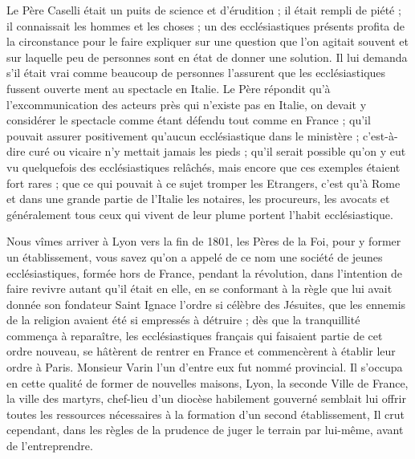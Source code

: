 \documentclass[11pt,a4paper]{report}
\begin{document}
Le Père Caselli était un puits de science et d'érudition ; il était rempli de piété ; il connaissait les hommes et les choses ; un des ecclésiastiques présents profita de la circonstance pour le faire expliquer sur une question que l'on agitait souvent et sur laquelle peu de personnes sont en état de donner une solution. Il lui demanda s'il était vrai comme beaucoup de personnes l'assurent que les ecclésiastiques fussent ouverte ment au spectacle en Italie. Le Père répondit qu'à l'excommunication des acteurs près qui n'existe pas en Italie, on devait y considérer le spectacle comme étant défendu tout comme en France ; qu'il pouvait assurer positivement qu'aucun ecclésiastique dans le ministère ; c'est-à-dire curé ou vicaire n'y mettait jamais les pieds ; qu'il serait possible qu'on y eut vu quelquefois des ecclésiastiques relâchés, mais encore que ces exemples étaient fort rares ; que ce qui pouvait à ce sujet tromper les Etrangers, c'est qu'à Rome et dans une grande partie de l'Italie les notaires, les procureurs, les avocats et généralement tous ceux qui vivent de leur plume portent l'habit ecclésiastique.

Nous vîmes arriver à Lyon vers la fin de 1801, les Pères de la Foi, pour y former un établissement, vous savez qu'on a appelé de ce nom une société de jeunes ecclésiastiques, formée hors de France, pendant la révolution, dans l'intention de faire revivre autant qu'il était en elle, en se conformant à la règle que lui avait donnée son fondateur Saint Ignace l'ordre si célèbre des Jésuites, que les ennemis de la religion avaient été si empressés à détruire ; dès que la tranquillité commença à reparaître, les ecclésiastiques français qui faisaient partie de cet ordre nouveau, se hâtèrent de rentrer en France et commencèrent à établir leur ordre à Paris. Monsieur Varin l'un d'entre eux fut nommé provincial. Il s'occupa en cette qualité de former de nouvelles maisons, Lyon, la seconde Ville de France, la ville des martyrs, chef-lieu d'un diocèse habilement gouverné semblait lui offrir toutes les ressources nécessaires à la formation d'un second établissement, Il crut cependant, dans les règles de la prudence de juger le terrain par lui-même, avant de l'entreprendre.
\end{document}
